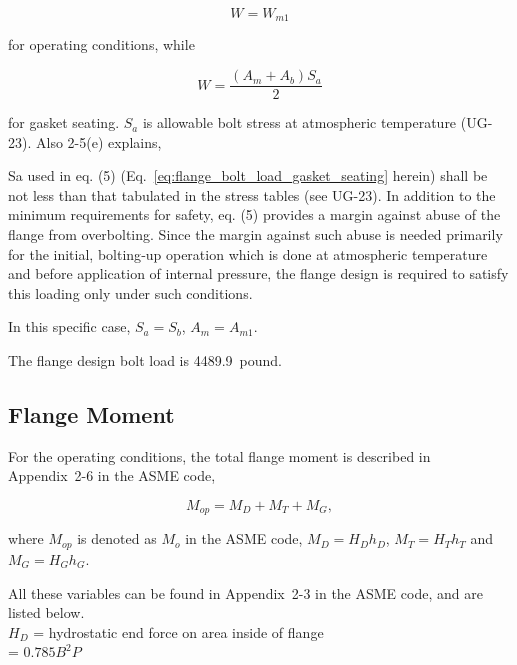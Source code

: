 \begin{equation}
    W = W_{m1}
\end{equation}

for operating conditions, while

\begin{equation}
    W = \frac{(A_m+A_b)S_a}{2}
\label{eq:flange_bolt_load_gasket_seating}
\end{equation}

for gasket seating.
$S_a$ is allowable bolt stress at atmospheric temperature (UG-23).
Also 2-5(e) explains,

\begin{displayquote}
    Sa used in eq. (5) (Eq.~\ref{eq:flange_bolt_load_gasket_seating} herein) 
    shall be not less than that tabulated in the stress tables (see UG-23). 
    In addition to the minimum requirements for safety, eq. (5) provides 
    a margin against abuse of the flange from overbolting. 
    Since the margin against such abuse is needed primarily for the initial, 
    bolting‐up operation which is done at atmospheric temperature and before 
    application of internal pressure, the flange design is required to satisfy 
    this loading only under such conditions.
\end{displayquote}

In this specific case, $S_a = S_b$, $A_m = A_{m1}$.

The flange design bolt load is 4489.9~pound.

\subsection{Flange Moment}
\label{app:flange_moment}

For the operating conditions, the total flange moment is described
in Appendix~2-6 in the ASME code,

\begin{equation}
    M_{op} = M_D+M_T+M_G,
\end{equation}

where $M_{op}$ is denoted as $M_o$ in the ASME code,
$M_D = H_Dh_D$, $M_T = H_Th_T$ and $M_G = H_Gh_G$.

All these variables can be found in Appendix~2-3 in the ASME code,
and are listed below.\\

$H_D$ = hydrostatic end force on area inside of flange \\
= $0.785B^2P$


